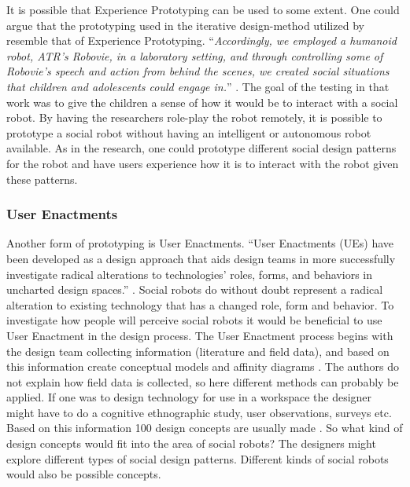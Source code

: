 It is possible that Experience Prototyping can be used to some extent. One could argue that the prototyping used in the iterative design-method utilized by \textcite{Kahn2008robot} resemble that of Experience Prototyping. ``\textit{Accordingly, we employed a humanoid robot, ATR’s Robovie, in a laboratory setting, and through controlling some of Robovie’s speech and action from behind the scenes, we created social situations that children and adolescents could engage in.}'' \parencite[][99]{Kahn2008robot}. The goal of the testing in that work was to give the children a sense of how it would be to interact with a social robot. By having the researchers role-play the robot remotely, it is possible to prototype a social robot without having an intelligent or autonomous robot available. As in the \textcite{Kahn2008robot} research, one could prototype different social design patterns for the robot and have users experience how it is to interact with the robot given these patterns.

\subsubsection{User Enactments}

Another form of prototyping is User Enactments. ``User Enactments (UEs) have been developed as a design approach that aids design teams in more successfully investigate radical alterations to technologies’ roles, forms, and behaviors in uncharted design spaces.'' \parencite[][338]{Odom:2012:FFU:2317956.2318008}. Social robots do without doubt represent a radical alteration to existing technology that has a changed role, form and behavior. To investigate how people will perceive social robots it would be beneficial to use User Enactment in the design process. The User Enactment process begins with the design team collecting information (literature and field data), and based on this information create conceptual models and affinity diagrams \parencite{Odom:2012:FFU:2317956.2318008}. The authors do not explain how field data is collected, so here different methods can probably be applied. If one was to design technology for use in a workspace the designer might have to do a cognitive ethnographic study, user observations, surveys etc. Based on this information 100 design concepts are usually made \parencite{Odom:2012:FFU:2317956.2318008}. So what kind of design concepts would fit into the area of social robots? The designers might explore different types of social design patterns. Different kinds of social robots would also be possible concepts.

